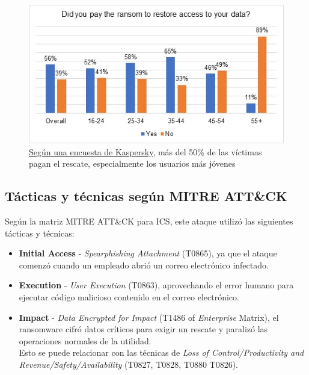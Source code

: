 
\begin{figure}[htbp]
    \centering
    \includegraphics{images/ransom.jpg}
    \caption{\href{https://www.kaspersky.com/about/press-releases/over-half-of-ransomware-victims-pay-the-ransom-but-only-a-quarter-see-their-full-data_returned}{Según una encuesta de Kaspersky}, más del 50\% de las víctimas pagan el rescate, especialmente los usuarios más jóvenes}
    \label{fig:ransom}
\end{figure}

\subsection{Tácticas y técnicas según MITRE ATT\&CK}
Según la matriz MITRE ATT\&CK para ICS, este ataque utilizó las siguientes tácticas y técnicas:

\begin{itemize}
    \item \textbf{Initial Access} - \textit{Spearphishing Attachment} (T0865), ya que el ataque comenzó cuando un empleado abrió un correo electrónico infectado.
    
    \item \textbf{Execution} - \textit{User Execution} (T0863), aprovechando el error humano para ejecutar código malicioso contenido en el correo electrónico.
    
    \item \textbf{Impact} - \textit{Data Encrypted for Impact} (T1486 of \textit{Enterprise} Matrix), el ransomware cifró datos críticos para exigir un rescate y paralizó las operaciones normales de la utilidad.\\
    Esto se puede relacionar con las técnicas de \textit{Loss of Control/Productivity and Revenue/Safety/Availability} (T0827, T0828, T0880 T0826).
\end{itemize}

